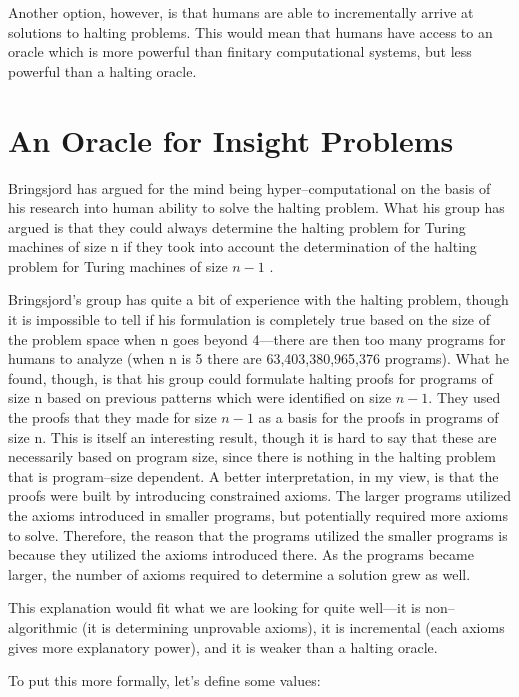 Another option, however, is that humans are able to incrementally arrive at solutions to halting problems.  This would mean that humans have access to an oracle which is more powerful than finitary computational systems, but less powerful than a halting oracle.

\section{An Oracle for Insight Problems}
Bringsjord has argued for the mind being hyper--computational on the basis of his research into human ability to solve the halting problem.  What his group has argued is that they could always determine the halting problem for Turing machines of size n if they took into account the determination of the halting problem for Turing machines of size $n - 1$ \citep{bringsjord2006}.

Bringsjord's group has quite a bit of experience with the halting problem, though it is impossible to tell if his formulation is completely true based on the size of the problem space when n goes beyond 4---there are then too many programs for humans to analyze (when n is 5 there are 63,403,380,965,376 programs).  What he found, though, is that his group could formulate halting proofs for programs of size n based on previous patterns which were identified on size $n - 1$.  They used the proofs that they made for size $n - 1$ as a basis for the proofs in programs of size n.  This is itself an interesting result, though it is hard to say that these are necessarily based on program size, since there is nothing in the halting problem that is program--size dependent.  A better interpretation, in my view, is that the proofs were built by introducing constrained axioms.  The larger programs utilized the axioms introduced in smaller programs, but potentially required more axioms to solve.  Therefore, the reason that the programs utilized the smaller programs is because they utilized the axioms introduced there.  As the programs became larger, the number of axioms required to determine a solution grew as well.

This explanation would fit what we are looking for quite well---it is non--algorithmic (it is determining unprovable axioms), it is incremental (each axioms gives more explanatory power), and it is weaker than a halting oracle.

To put this more formally, let's define some values: 

